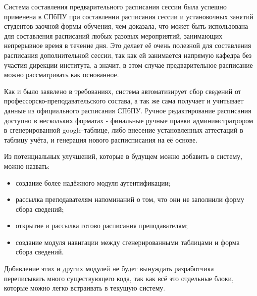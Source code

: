 Система составления предварительного расписания сессии была успешно применена в СПбПУ при составлении расписания сессии и установочных занятий студентов заочной формы обучения, чем доказала, что может быть использована для составления расписаний любых разовых мероприятий, занимающих непрерывное время в течение дня. Это делает её очень полезной для составления расписания дополнительной сессии, так как ей занимается напрямую кафедра без участия дирекции института, а значит, в этом случае предварительное расписание можно рассматривать как основанное.

Как и было заявлено в требованиях, система автоматизирует сбор сведений от профессорско-преподавательского состава, а так же сама получает и учитывает данные из официального расписания СПбПУ. Ручное редактирование расписания доступно в нескольких форматах - финальные ручные правки админимстратрором в сгенерированной google-таблице, либо внесение установленных аттестаций в таблицу учёта, и генерация нового расписписания на её основе.

Из потенциальных улучшений, которые в будущем можно добавить в систему, можно назвать:
\begin{itemize}
\item создание более надёжного модуля аутентификации;
\item рассылка преподавателям напоминаний о том, что они не заполнили форму сбора сведений;
\item открытие и рассылка готово расписания преподавателям;
\item создание модуля навигации между сгенерированными таблицами и форма сбора сведений.
\end{itemize} 	

Добавление этих и других модулей не будет вынуждать разработчика переписывать много существующего кода, так как всё это отдельные блоки, которые можно легко встраивать в текущую систему.